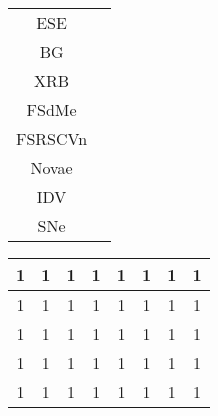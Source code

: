 \setlength{\tabcolsep}{5pt}
\setlength{\extrarowheight}{1pt}
\clearpage
\begin{minipage}[c]{\textwidth}
	
	\begin{minipage}[c]{\textwidth}
		\begin{minipage}[c]{0.09\textwidth}
		\end{minipage}
		\begin{minipage}[r]{0.06\textwidth}
			\tiny {
			\begin{tabular}	{c>{\centering\arraybackslash} m{0pt}}
				ESE & \\ 
				BG & \\ 
				XRB & \\ 
				FSdMe & \\ 
				FSRSCVn & \\ 
				Novae & \\ 
				IDV & \\ 
				SNe & \\ 
			\end{tabular}
			}
		\end{minipage}
		\begin{minipage}[c]{0.27\textwidth}
			\centering
			\tiny {
			\begin{tabular}{|c|c|c|c|c|c|c|c|}\hline
\cellcolor[rgb]{0,0,0} 1 & \cellcolor[rgb]{0,0,0} 1 & \cellcolor[rgb]{0,0,0} 1 & \cellcolor[rgb]{0,0,0} 1 & \cellcolor[rgb]{0,0,0} 1 & \cellcolor[rgb]{0,0,0} 1 & \cellcolor[rgb]{0,0,0} 1 & \cellcolor[rgb]{0,0,0} 1 \\ \hline
\cellcolor[rgb]{0,0,0} 1 & \cellcolor[rgb]{0,0,0} 1 & \cellcolor[rgb]{0,0,0} 1 & \cellcolor[rgb]{0,0,0} 1 & \cellcolor[rgb]{0,0,0} 1 & \cellcolor[rgb]{0,0,0} 1 & \cellcolor[rgb]{0,0,0} 1 & \cellcolor[rgb]{0,0,0} 1 \\ \hline
\cellcolor[rgb]{0,0,0} 1 & \cellcolor[rgb]{0,0,0} 1 & \cellcolor[rgb]{0,0,0} 1 & \cellcolor[rgb]{0,0,0} 1 & \cellcolor[rgb]{0,0,0} 1 & \cellcolor[rgb]{0,0,0} 1 & \cellcolor[rgb]{0,0,0} 1 & \cellcolor[rgb]{0,0,0} 1 \\ \hline
\cellcolor[rgb]{0,0,0} 1 & \cellcolor[rgb]{0,0,0} 1 & \cellcolor[rgb]{0,0,0} 1 & \cellcolor[rgb]{0,0,0} 1 & \cellcolor[rgb]{0,0,0} 1 & \cellcolor[rgb]{0,0,0} 1 & \cellcolor[rgb]{0,0,0} 1 & \cellcolor[rgb]{0,0,0} 1 \\ \hline
\cellcolor[rgb]{0,0,0} 1 & \cellcolor[rgb]{0,0,0} 1 & \cellcolor[rgb]{0,0,0} 1 & \cellcolor[rgb]{0,0,0} 1 & \cellcolor[rgb]{0,0,0} 1 & \cellcolor[rgb]{0,0,0} 1 & \cellcolor[rgb]{0,0,0} 1 & \cellcolor[rgb]{0,0,0} 1 \\ \hline

\end{tabular}}
\end{minipage}
\end{minipage}
\end{minipage}
